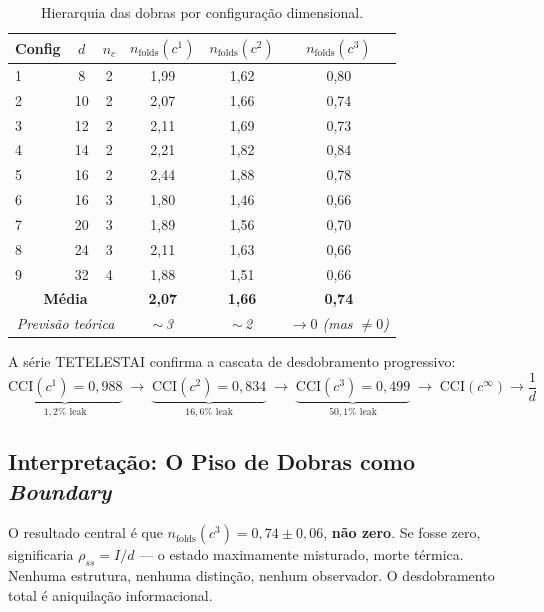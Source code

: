 \documentclass[12pt,a4paper,twoside]{article}
\begin{document}
\begin{table}[H]
\centering
\caption{Hierarquia das dobras por configura\c{c}\~ao dimensional.}
\label{tab:folds_hierarchy}
\small
\begin{tabular}{lccccc}
\toprule
\textbf{Config} & $d$ & $n_c$ & $n_{\text{folds}}(c^1)$ & $n_{\text{folds}}(c^2)$ & $n_{\text{folds}}(c^3)$ \\
\midrule
1 & 8  & 2 & 1{,}99 & 1{,}62 & 0{,}80 \\
2 & 10 & 2 & 2{,}07 & 1{,}66 & 0{,}74 \\
3 & 12 & 2 & 2{,}11 & 1{,}69 & 0{,}73 \\
4 & 14 & 2 & 2{,}21 & 1{,}82 & 0{,}84 \\
5 & 16 & 2 & 2{,}44 & 1{,}88 & 0{,}78 \\
6 & 16 & 3 & 1{,}80 & 1{,}46 & 0{,}66 \\
7 & 20 & 3 & 1{,}89 & 1{,}56 & 0{,}70 \\
8 & 24 & 3 & 2{,}11 & 1{,}63 & 0{,}66 \\
9 & 32 & 4 & 1{,}88 & 1{,}51 & 0{,}66 \\
\midrule
\multicolumn{3}{c}{\textbf{M\'edia}} & \textbf{2{,}07} & \textbf{1{,}66} & \textbf{0{,}74} \\
\multicolumn{3}{c}{\textit{Previs\~ao te\'orica}} & \textit{$\sim$\,3} & \textit{$\sim$\,2} & \textit{$\to 0$ (mas $\neq 0$)} \\
\bottomrule
\end{tabular}
\end{table}

A s\'erie TETELESTAI confirma a cascata de desdobramento progressivo:
\begin{equation}
\underbrace{\text{CCI}(c^1) = 0{,}988}_{1{,}2\%\text{ leak}} \;\to\;
\underbrace{\text{CCI}(c^2) = 0{,}834}_{16{,}6\%\text{ leak}} \;\to\;
\underbrace{\text{CCI}(c^3) = 0{,}499}_{50{,}1\%\text{ leak}} \;\to\;
\text{CCI}(c^\infty) \to \frac{1}{d}
\label{eq:tetelestai}
\end{equation}

\subsection{Interpreta\c{c}\~ao: O Piso de Dobras como \textit{Boundary}}

O resultado central \'e que $n_{\text{folds}}(c^3) = 0{,}74 \pm 0{,}06$, \textbf{n\~ao zero}. Se fosse zero, significaria $\rho_{ss} = I/d$ --- o estado maximamente misturado, morte t\'ermica. Nenhuma estrutura, nenhuma distin\c{c}\~ao, nenhum observador. O desdobramento total \'e aniquila\c{c}\~ao informacional.
\end{document}
